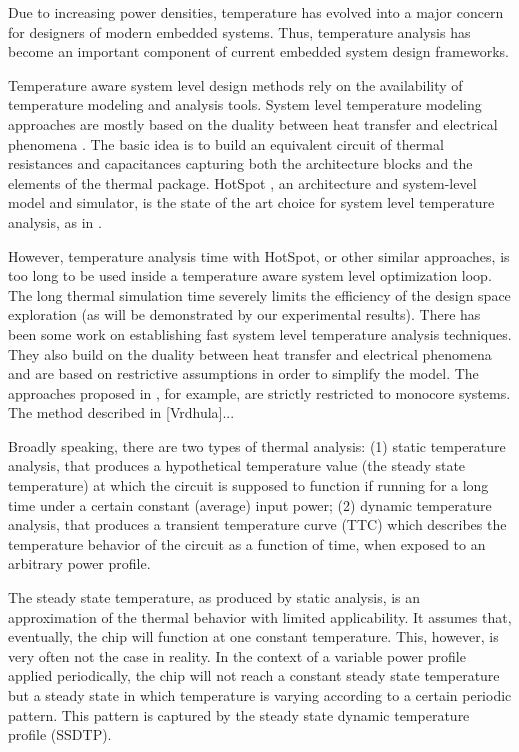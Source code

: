 Due to increasing power densities, temperature has evolved into a major concern for designers of modern embedded systems. Thus, temperature analysis has become an important component of current embedded system design frameworks.

Temperature aware system level design methods rely on the availability of temperature modeling and analysis tools. System level temperature modeling approaches are mostly based on the duality between heat transfer and electrical phenomena \cite{kreith2000}. The basic idea is to build an equivalent circuit of thermal resistances and capacitances capturing both the architecture blocks and the elements of the thermal package. HotSpot \cite{huang2008}, an architecture and system-level model and simulator, is the state of the art choice for system level temperature analysis, as in \cite{lu2004, srinivasan2004, liao2005, coskun2006, liu2007, huang2009, xiang2010, thiele2011}.

However, temperature analysis time with HotSpot, or other similar approaches, is too long to be used inside a temperature aware system level optimization loop. The long thermal simulation time severely limits the efficiency of the design space exploration (as will be demonstrated by our experimental results). There has been some work on establishing fast system level temperature analysis techniques. They also build on the duality between heat transfer and electrical phenomena and are based on restrictive assumptions in order to simplify the model. The approaches proposed in \cite{bao2010, thiele2011}, for example, are strictly restricted to monocore systems. The method described in [Vrdhula]...

Broadly speaking, there are two types of thermal analysis: (1) static temperature analysis, that produces a hypothetical temperature value (the steady state temperature) at which the circuit is supposed to function if running for a long time under a certain constant (average) input power; (2) dynamic temperature analysis, that produces a transient temperature curve (TTC) which describes the temperature behavior of the circuit as a function of time, when exposed to an arbitrary power profile.

The steady state temperature, as produced by static analysis, is an approximation of the thermal behavior with limited applicability. It assumes that, eventually, the chip will function at one constant temperature.  This, however, is very often not the case in reality. In the context of a variable power profile applied periodically, the chip will not reach a constant steady state temperature but a steady state in which temperature is varying according to a certain periodic pattern. This pattern is captured by the steady state dynamic temperature profile (SSDTP).

